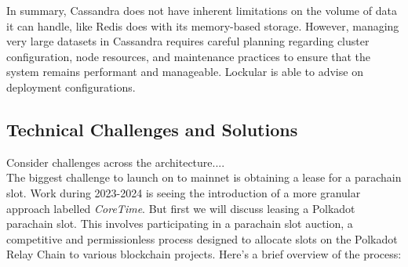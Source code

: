 \documentclass{tufte-handout}
\begin{document}
In summary, Cassandra does not have inherent limitations on the volume of data it can handle, like Redis does with its memory-based storage.
However, managing very large datasets in Cassandra requires careful planning regarding cluster configuration, node resources, and
maintenance practices to ensure that the system remains performant and manageable. Lockular is able to advise on deployment configurations.
\subsection{Technical Challenges and Solutions}
Consider challenges across the architecture....\\
\vspace{10pt}
The biggest challenge to launch on to mainnet is obtaining a lease for a parachain slot. Work during 2023-2024 is seeing the introduction
of a more granular approach labelled \textit{CoreTime}. But first we will discuss leasing a Polkadot parachain slot. This involves participating in a parachain
slot auction, a competitive and permissionless process designed to allocate slots on the Polkadot Relay Chain to various blockchain projects.
Here's a brief overview of the process:
\end{document}
